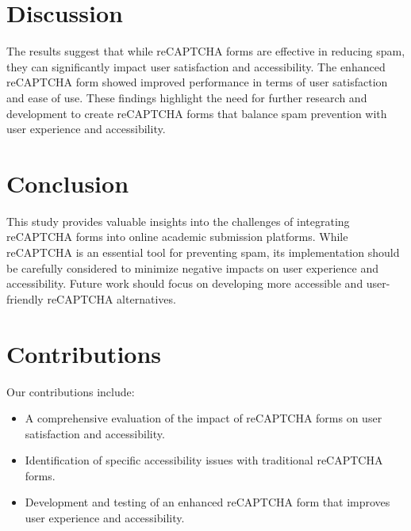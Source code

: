 \documentclass{article}
\begin{document}
\section{Discussion}
The results suggest that while reCAPTCHA forms are effective in reducing spam, they can significantly impact user satisfaction and accessibility. The enhanced reCAPTCHA form showed improved performance in terms of user satisfaction and ease of use. These findings highlight the need for further research and development to create reCAPTCHA forms that balance spam prevention with user experience and accessibility.

\section{Conclusion}
This study provides valuable insights into the challenges of integrating reCAPTCHA forms into online academic submission platforms. While reCAPTCHA is an essential tool for preventing spam, its implementation should be carefully considered to minimize negative impacts on user experience and accessibility. Future work should focus on developing more accessible and user-friendly reCAPTCHA alternatives.

\section{Contributions}
Our contributions include:
\begin{itemize}
    \item A comprehensive evaluation of the impact of reCAPTCHA forms on user satisfaction and accessibility.
    \item Identification of specific accessibility issues with traditional reCAPTCHA forms.
    \item Development and testing of an enhanced reCAPTCHA form that improves user experience and accessibility.
\end{itemize}



\end{document}
